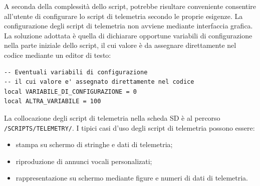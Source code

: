 \documentclass[a4paper, 12pt]{report} %
\begin{document}
A seconda della complessità dello script, potrebbe risultare conveniente consentire all'utente di configurare lo script di telemetria secondo le proprie esigenze. La configurazione degli script di telemetria non avviene mediante interfaccia grafica. La soluzione adottata è quella di dichiarare opportune variabili di configurazione nella parte iniziale dello script, il cui valore è da assegnare direttamente nel codice mediante un editor di testo:

\begin{lstlisting}
-- Eventuali variabili di configurazione
-- il cui valore e' assegnato direttamente nel codice
local VARIABILE_DI_CONFIGURAZIONE = 0
local ALTRA_VARIABILE = 100
\end{lstlisting}

La collocazione degli script di telemetria nella scheda SD è al percorso \texttt{/SCRIPTS/TELEMETRY/}. 
I tipici casi d'uso degli script di telemetria possono essere:
\begin{itemize}
        \item stampa su schermo di stringhe e dati di telemetria;
        \item riproduzione di annunci vocali personalizati;
        \item rappresentazione su schermo mediante figure e numeri di dati di telemetria.
\end{itemize}
\end{document}
